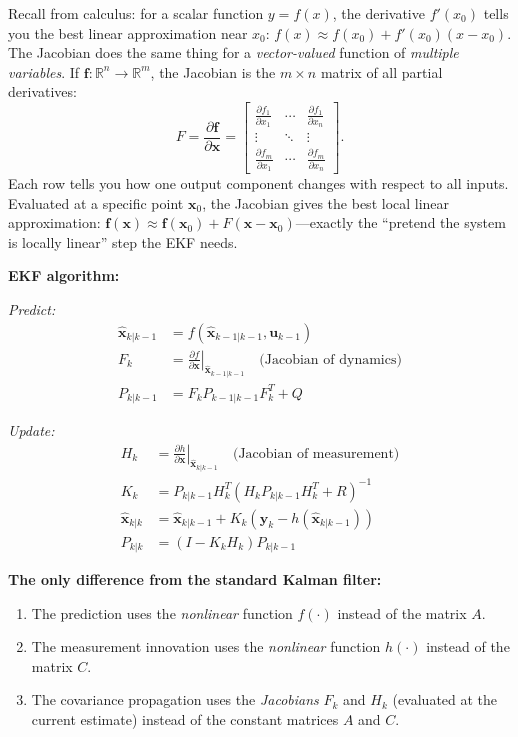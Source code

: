Recall from calculus: for a scalar function $y = f(x)$, the derivative $f'(x_0)$ tells you the best linear approximation near $x_0$: $f(x) \approx f(x_0) + f'(x_0)(x - x_0)$. The Jacobian does the same thing for a \emph{vector-valued} function of \emph{multiple variables}. If $\mathbf{f}: \mathbb{R}^n \to \mathbb{R}^m$, the Jacobian is the $m \times n$ matrix of all partial derivatives:
\[
F = \frac{\partial \mathbf{f}}{\partial \mathbf{x}} = \begin{bmatrix}
\frac{\partial f_1}{\partial x_1} & \cdots & \frac{\partial f_1}{\partial x_n} \\
\vdots & \ddots & \vdots \\
\frac{\partial f_m}{\partial x_1} & \cdots & \frac{\partial f_m}{\partial x_n}
\end{bmatrix}.
\]
Each row tells you how one output component changes with respect to all inputs. Evaluated at a specific point $\mathbf{x}_0$, the Jacobian gives the best local linear approximation: $\mathbf{f}(\mathbf{x}) \approx \mathbf{f}(\mathbf{x}_0) + F(\mathbf{x} - \mathbf{x}_0)$---exactly the ``pretend the system is locally linear'' step the EKF needs.

\textbf{EKF algorithm:}

\textit{Predict:}
\begin{align}
\hat{\mathbf{x}}_{k|k-1} &= f(\hat{\mathbf{x}}_{k-1|k-1}, \mathbf{u}_{k-1}) \\
F_k &= \left.\frac{\partial f}{\partial \mathbf{x}}\right|_{\hat{\mathbf{x}}_{k-1|k-1}} \quad \text{(Jacobian of dynamics)} \\
P_{k|k-1} &= F_k P_{k-1|k-1} F_k^T + Q
\end{align}

\textit{Update:}
\begin{align}
H_k &= \left.\frac{\partial h}{\partial \mathbf{x}}\right|_{\hat{\mathbf{x}}_{k|k-1}} \quad \text{(Jacobian of measurement)} \\
K_k &= P_{k|k-1} H_k^T (H_k P_{k|k-1} H_k^T + R)^{-1} \\
\hat{\mathbf{x}}_{k|k} &= \hat{\mathbf{x}}_{k|k-1} + K_k \left(\mathbf{y}_k - h(\hat{\mathbf{x}}_{k|k-1})\right) \\
P_{k|k} &= (I - K_k H_k) P_{k|k-1}
\end{align}

\textbf{The only difference from the standard Kalman filter:}
\begin{enumerate}
    \item The prediction uses the \textit{nonlinear} function $f(\cdot)$ instead of the matrix $A$.
    \item The measurement innovation uses the \textit{nonlinear} function $h(\cdot)$ instead of the matrix $C$.
    \item The covariance propagation uses the \textit{Jacobians} $F_k$ and $H_k$ (evaluated at the current estimate) instead of the constant matrices $A$ and $C$.
\end{enumerate}

